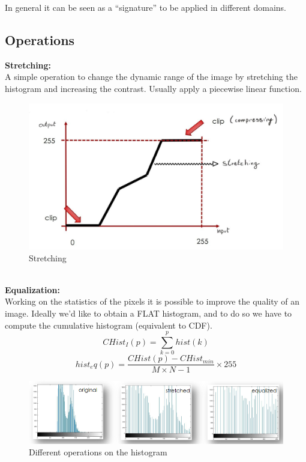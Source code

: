     In general it can be seen as a “signature” to be applied in different domains.
    
\subsection{Operations}

\textbf{Stretching:}
\\A simple operation to change the dynamic range of the image by stretching the histogram and increasing the contrast. Usually apply a piecewise linear function. 
\begin{figure}[h]
    \centering
    \includegraphics[scale=0.3]{Figures/Stretching.jpeg}
    \caption{Stretching}
    \label{fig:enter-label}
\end{figure}   
\\ 
\textbf{Equalization:}
\\Working on the statistics of the pixels it is possible to improve the quality of an image. Ideally we’d like to obtain a FLAT histogram, and to do so we have to compute the cumulative histogram (equivalent to CDF).
    \[
        CHist_I(p) = \sum_{k=0}^{p} hist(k)
    \]
    \[
        hist_eq(p) = \frac{CHist(p)-CHist_{min}}{M \times N-1}\times 255
    \]
\begin{figure}[h]
    \centering
    \includegraphics[scale=0.5]{Figures/OperationsHist.png}
    \caption{Different operations on the histogram}
    \label{fig:enter-label}
\end{figure}
    
